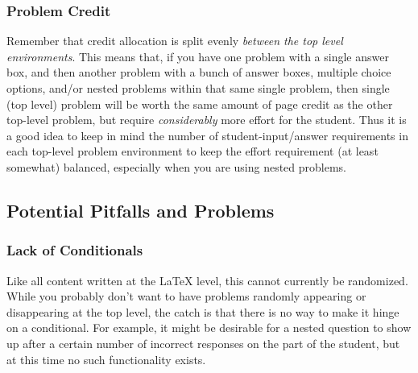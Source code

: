 \documentclass{ximera}
\begin{document}
        \subsubsection*{Problem Credit}
            Remember that credit allocation is split evenly \emph{between the top level environments}. This means that, if you have one problem with a single answer box, and then another problem with a bunch of answer boxes, multiple choice options, and/or nested problems within that same single problem, then single (top level) problem will be worth the same amount of page credit as the other top-level problem, but require \textit{considerably} more effort for the student. Thus it is a good idea to keep in mind the number of student-input/answer requirements in each top-level problem environment to keep the effort requirement (at least somewhat) balanced, especially when you are using nested problems.
    
    \subsection{Potential Pitfalls and Problems}
        \subsubsection{Lack of Conditionals}
            Like all content written at the LaTeX level, this cannot currently be randomized.  While you probably don't want to have problems randomly appearing or disappearing at the top level, the catch is that there is no way to make it hinge on a conditional.  For example, it might be desirable for a nested question to show up after a certain number of incorrect responses on the part of the student, but at this time no such functionality exists.
\end{document}
